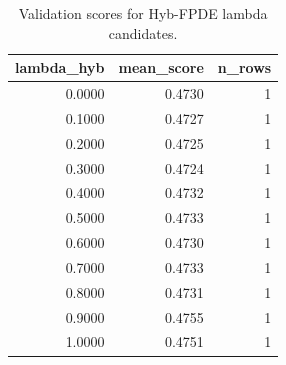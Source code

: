 \begin{table}[t]
\caption{Validation scores for Hyb-FPDE lambda candidates.}
\label{tab:lambda_distribution_computed}
\centering
\begin{tabular}{rrr}
\toprule
lambda\_hyb & mean\_score & n\_rows \\
\midrule
0.0000 & 0.4730 & 1 \\
0.1000 & 0.4727 & 1 \\
0.2000 & 0.4725 & 1 \\
0.3000 & 0.4724 & 1 \\
0.4000 & 0.4732 & 1 \\
0.5000 & 0.4733 & 1 \\
0.6000 & 0.4730 & 1 \\
0.7000 & 0.4733 & 1 \\
0.8000 & 0.4731 & 1 \\
0.9000 & 0.4755 & 1 \\
1.0000 & 0.4751 & 1 \\
\bottomrule
\end{tabular}

\end{table}
